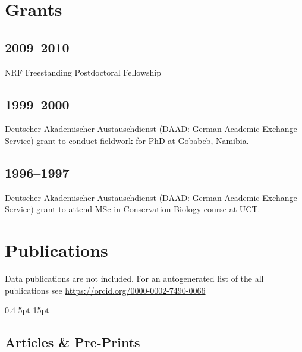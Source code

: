 \documentclass[a4paper]{article}
\begin{document}



\section{Grants}

\subsection{2009--2010}

NRF Freestanding Postdoctoral Fellowship

\subsection{1999--2000}

Deutscher Akademischer Austauschdienst (DAAD: German Academic Exchange
	Service) grant to conduct fieldwork for PhD at Gobabeb, Namibia.

\subsection{1996--1997}

Deutscher Akademischer Austauschdienst (DAAD: German Academic Exchange
	Service) grant to attend MSc in Conservation Biology course at UCT.
	
\section{Publications}

Data publications are not included. For an autogenerated list of the all
	publications see \url{https://orcid.org/0000-0002-7490-0066}

\titlespacing{\subsection}
            {0.4\textwidth}%
            {5pt}%
            {15pt}%
            
            
\subsection{Articles \& Pre-Prints}
\end{document}
